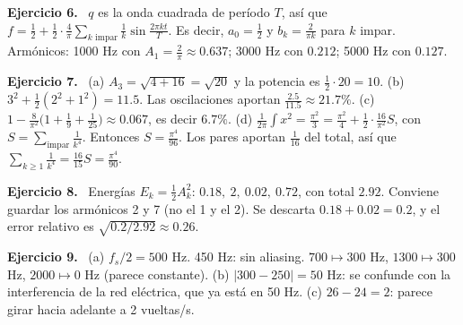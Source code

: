\documentclass[11pt,a4paper]{article}
\newcommand{\sol}[1]{\par\medskip\noindent\textbf{Ejercicio #1.}\ }
\begin{document}
\sol{6}
$q$ es la onda cuadrada de período $T$, así que $f=\frac12+\frac12\cdot\frac4\pi\sum_{k\text{ impar}}\frac1k\sin\frac{2\pi kt}{T}$. Es decir, $a_0=\frac12$ y $b_k=\frac2{\pi k}$ para $k$ impar.
Armónicos: 1000 Hz con $A_1=\frac2\pi\approx0.637$; 3000 Hz con $0.212$; 5000 Hz con $0.127$.

\sol{7}
(a) $A_3=\sqrt{4+16}=\sqrt{20}$ y la potencia es $\frac12\cdot20=10$.
(b) $3^2+\frac12(2^2+1^2)=11.5$. Las oscilaciones aportan $\frac{2.5}{11.5}\approx21.7\%$.
(c) $1-\frac8{\pi^2}\big(1+\frac19+\frac1{25}\big)\approx0.067$, es decir $6.7\%$.
(d) $\frac1{2\pi}\int x^2=\frac{\pi^2}3=\frac{\pi^2}4+\frac12\cdot\frac{16}{\pi^2}S$, con $S=\sum_{\text{impar}}\frac1{k^4}$. Entonces $S=\frac{\pi^4}{96}$. Los pares aportan $\frac1{16}$ del total, así que $\sum_{k\ge1}\frac1{k^4}=\frac{16}{15}S=\frac{\pi^4}{90}$.

\sol{8}
Energías $E_k=\frac12A_k^2$: $0.18,\ 2,\ 0.02,\ 0.72$, con total $2.92$. Conviene guardar los armónicos 2 y 7 (no el 1 y el 2). Se descarta $0.18+0.02=0.2$, y el error relativo es $\sqrt{0.2/2.92}\approx0.26$.

\sol{9}
(a) $f_s/2=500$ Hz. 450 Hz: sin aliasing. $700\mapsto300$ Hz, $1300\mapsto300$ Hz, $2000\mapsto0$ Hz (parece constante).
(b) $|300-250|=50$ Hz: se confunde con la interferencia de la red eléctrica, que ya está en 50 Hz.
(c) $26-24=2$: parece girar hacia adelante a 2 vueltas/s.
\end{document}
